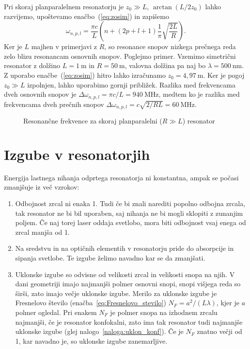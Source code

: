 Pri skoraj planparalelnem 
resonatorju je $z_{0}\gg L$, $\arctan(L/2z_{0})$ lahko razvijemo, 
upoštevamo enačbo~(\ref{eq:zosim}) in zapišemo
\begin{equation}
\omega_{n,p,l}=\frac{\pi c}{L}\left(n+(2p+l+1)\frac{1}{\pi}\sqrt{\frac{2L}{R}}\right).
\end{equation}
Ker je $L$ majhen v primerjavi z $R$, so resonance snopov nizkega prečnega reda 
zelo blizu resonancam osnovnih snopov. Poglejmo primer. Vzemimo 
simetrični resonator z dolžino $L=1~\si{\metre}$ in $R=50~\si{\metre}$, 
valovna dolžina pa naj bo $\lambda= 500~\si{\nano\metre}$. Z uporabo enačbe~(\ref{eq:zosim})
hitro lahko izračunamo $z_0 = 4,97~\si{\metre}$. Ker je pogoj $z_0\gg L$ izpolnjen, lahko uporabimo
gornji približek. Razlika med frekvencama dveh osnovnih snopov je $\Delta \omega_{n,p,l} = 
\pi c/L = 940~\si{\mega\hertz}$, medtem ko je razlika med frekvencama dveh prečnih snopov
$\Delta \omega_{n,p,l} = c\sqrt{2/RL} = 60~\si{\mega\hertz}$.
\begin{figure}[h]
\centering
\def\svgwidth{90truemm} 

\caption{Resonančne frekvence za skoraj planparalelni ($R\gg L$) resonator}
\label{fig:crte}
\end{figure}

\section{Izgube v resonatorjih}
Energija lastnega nihanja odprtega resonatorja ni konstantna, ampak se počasi
zmanjšuje iz več vzrokov:
\begin{enumerate}
\item Odbojnost zrcal ni enaka 1. Tudi če bi znali narediti popolno odbojna zrcala, 
tak resonator ne bi bil uporaben, saj nihanja ne bi mogli sklopiti z zunanjim poljem. Če 
naj torej laser oddaja svetlobo, mora biti odbojnost vsaj enega od zrcal manjša od 1.\\
\item Na sredstvu in na optičnih elementih v resonatorju pride do absorpcije in
sipanja svetlobe. Te izgube želimo navadno kar se da zmanjšati.\\
\item Uklonske izgube so odvisne od velikosti zrcal in velikosti snopa na njih.
V dani geometriji imajo najmanjši polmer osnovni snopi, snopi višjega
reda so širši, zato imajo večje uklonske izgube. Merilo za uklonske
izgube je Fresnelovo število (enačba~\ref{eq:Fresnelovo_stevilo}) 
$N_{F}=a^{2}/(L\lambda)$, kjer je $a$ polmer ogledal. Pri enakem $N_{F}$ je
polmer snopa na izhodnem zrcalu najmanjši, če je resonator konfokalni, 
zato ima tak resonator tudi najmanjše uklonske izgube (glej nalogo~\ref{naloga:uklon_konf}).
Če je $N_{F}$ znatno večji od 1, kar navadno je, so uklonske izgube zanemarljive. 
\end{enumerate}

